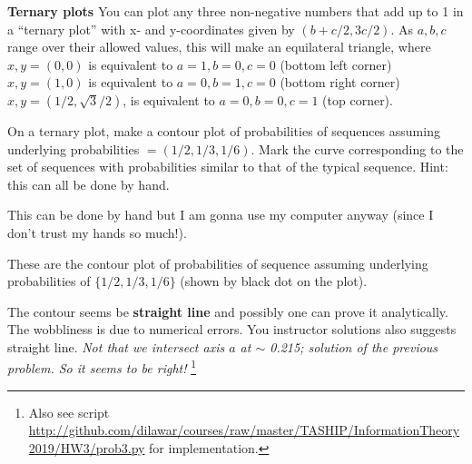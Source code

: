 \documentclass[twocolumn, answers]{exam}
\begin{document}
\begin{questions}
\bonusquestion[10] \textbf{Ternary plots}
You can plot any three non-negative numbers that add up to 1 in a “ternary plot” with
x- and y-coordinates given by $(b + c/2, 3c/2)$. As $a, b, c$ range over their
allowed values, this will make an equilateral triangle,
where $x, y = (0,0)$ is equivalent to ${a = 1, b = 0, c = 0}$ (bottom left corner)
$x, y = (1,0)$ is equivalent to ${a = 0, b = 1, c = 0}$ (bottom right corner)
$x, y =(1/2, \sqrt{3}/2)$, is equivalent to ${a = 0, b = 0, c = 1}$ (top
corner).

On a ternary plot, make a contour plot of probabilities of sequences assuming
underlying probabilities $=(1/2,1/3,1/6)$. Mark the curve corresponding to the
set of sequences with probabilities similar to that of the typical sequence.
Hint: this can all be done by hand.

\begin{solution}
    This can be done by hand but I am gonna use my computer anyway (since I
    don't trust my hands so much!).


    These are the contour plot of probabilities of sequence assuming underlying
    probabilities of $\{1/2, 1/3, 1/6\}$ (shown by black dot on the plot).

    The contour seems be \textbf{straight line} and possibly one can prove it
    analytically. The wobbliness is due to numerical errors.
    You instructor solutions also suggests straight line.
    \emph{Not that we intersect axis $a$ at $\sim$ 0.215; solution of the
    previous problem. So it seems to be right!}
    \footnote{Also see script
    \url{http://github.com/dilawar/courses/raw/master/TASHIP/InformationTheory2019/HW3/prob3.py}
    for implementation.}

\end{solution}
\end{questions}
\end{document}
